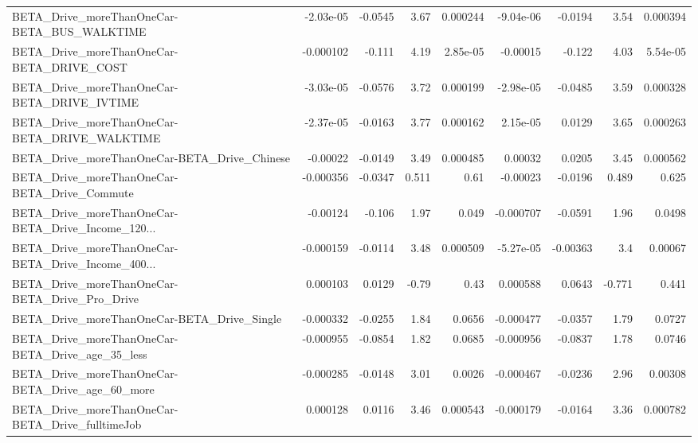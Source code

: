 \begin{tabular}{lrrrrrrrr}
BETA\_Drive\_moreThanOneCar-BETA\_BUS\_WALKTIME        &   -2.03e-05 &      -0.0545 &      3.67 & 0.000244 &  -9.04e-06 &     -0.0194 &         3.54 &      0.000394 \\
BETA\_Drive\_moreThanOneCar-BETA\_DRIVE\_COST          &   -0.000102 &       -0.111 &      4.19 & 2.85e-05 &   -0.00015 &      -0.122 &         4.03 &      5.54e-05 \\
BETA\_Drive\_moreThanOneCar-BETA\_DRIVE\_IVTIME        &   -3.03e-05 &      -0.0576 &      3.72 & 0.000199 &  -2.98e-05 &     -0.0485 &         3.59 &      0.000328 \\
BETA\_Drive\_moreThanOneCar-BETA\_DRIVE\_WALKTIME      &   -2.37e-05 &      -0.0163 &      3.77 & 0.000162 &   2.15e-05 &      0.0129 &         3.65 &      0.000263 \\
BETA\_Drive\_moreThanOneCar-BETA\_Drive\_Chinese       &    -0.00022 &      -0.0149 &      3.49 & 0.000485 &    0.00032 &      0.0205 &         3.45 &      0.000562 \\
BETA\_Drive\_moreThanOneCar-BETA\_Drive\_Commute       &   -0.000356 &      -0.0347 &     0.511 &     0.61 &   -0.00023 &     -0.0196 &        0.489 &         0.625 \\
BETA\_Drive\_moreThanOneCar-BETA\_Drive\_Income\_120... &    -0.00124 &       -0.106 &      1.97 &    0.049 &  -0.000707 &     -0.0591 &         1.96 &        0.0498 \\
BETA\_Drive\_moreThanOneCar-BETA\_Drive\_Income\_400... &   -0.000159 &      -0.0114 &      3.48 & 0.000509 &  -5.27e-05 &    -0.00363 &          3.4 &       0.00067 \\
BETA\_Drive\_moreThanOneCar-BETA\_Drive\_Pro\_Drive     &    0.000103 &       0.0129 &     -0.79 &     0.43 &   0.000588 &      0.0643 &       -0.771 &         0.441 \\
BETA\_Drive\_moreThanOneCar-BETA\_Drive\_Single        &   -0.000332 &      -0.0255 &      1.84 &   0.0656 &  -0.000477 &     -0.0357 &         1.79 &        0.0727 \\
BETA\_Drive\_moreThanOneCar-BETA\_Drive\_age\_35\_less   &   -0.000955 &      -0.0854 &      1.82 &   0.0685 &  -0.000956 &     -0.0837 &         1.78 &        0.0746 \\
BETA\_Drive\_moreThanOneCar-BETA\_Drive\_age\_60\_more   &   -0.000285 &      -0.0148 &      3.01 &   0.0026 &  -0.000467 &     -0.0236 &         2.96 &       0.00308 \\
BETA\_Drive\_moreThanOneCar-BETA\_Drive\_fulltimeJob   &    0.000128 &       0.0116 &      3.46 & 0.000543 &  -0.000179 &     -0.0164 &         3.36 &      0.000782 \\

\end{tabular}
